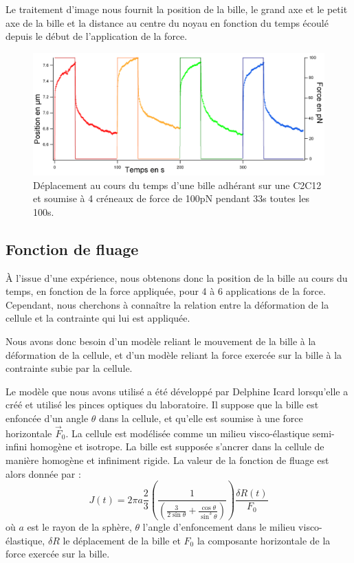 \documentclass{report}
\begin{document}
	Le traitement d'image nous fournit la position de la bille, le grand axe et le petit axe de la bille et la distance au centre du noyau en fonction du temps écoulé depuis le début de l'application de la force. 
	
	
	\begin{figure}
	\includegraphics[scale=0.11]{c9-rigidification-couleurs.png}
	\caption{Déplacement au cours du temps d'une bille adhérant sur une C2C12 et soumise à 4 créneaux de force de 100pN pendant 33s toutes les 100s. }
	\end{figure}
	\subsection{Fonction de fluage}
	\`A l'issue d'une expérience, nous obtenons donc la position de la bille au cours du temps, en fonction de la force appliquée, pour 4 à 6 applications de la force. 
	Cependant, nous cherchons à connaître la relation entre la déformation de la cellule et la contrainte qui lui est appliquée.
	
	Nous avons donc besoin d'un modèle reliant le mouvement de la bille à la déformation de la cellule, et d'un modèle reliant la force exercée sur la bille à la contrainte subie par la cellule. 
	
	Le modèle que nous avons utilisé a été développé par Delphine Icard lorsqu'elle a créé et utilisé les pinces optiques du laboratoire. Il suppose que la bille est enfoncée d'un angle $\theta$ dans la cellule, et qu'elle est soumise à une force horizontale $\vec{F}_0$. La cellule est modélisée comme un milieu visco-élastique semi-infini homogène et isotrope. La bille est supposée s'ancrer dans la cellule de manière homogène et infiniment rigide. 
	La valeur de la fonction de fluage est alors donnée par : 
	\begin{equation}
	J(t)=2\pi a \frac{2}{3}\left(\frac{1}{\left( \frac{3}{2 \sin \theta}+\frac{\cos \theta}{\sin^3 \theta}\right)} \right)  \frac{\delta R(t)}{F_0}
	\label{Fluage}
	\end{equation}
	où $a$ est le rayon de la sphère, $\theta$ l'angle d'enfoncement dans le milieu visco-élastique, $\delta R$ le déplacement de la bille et $F_0$ la composante horizontale de la force exercée sur la bille. 
	
\end{document}
